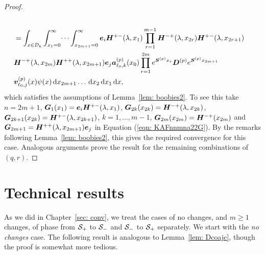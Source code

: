 \begin{proof}
\begin{align*}
		\\&=\int_{x\in\mathcal{D}_k}\int_{x_1=0}^\infty \dots \int_{x_{2m+1}=0}^\infty \boldsymbol e_i \boldsymbol H^{+-}(\lambda,x_1)\prod_{r=1}^{m-1}\boldsymbol H^{-+}(\lambda,x_{2r}) \boldsymbol H^{+-}(\lambda,x_{2r+1}) \\&\boldsymbol H^{-+}(\lambda,x_{2m}) 
		\boldsymbol H^{++}(\lambda,x_{2m+1})\boldsymbol e_j \nonumber
		\boldsymbol a_{\ell_0,k}^{(p)}(x_0)\prod_{r=1}^{2m} e^{\boldsymbol{S}^{(p)}x_{r}}\boldsymbol{D}^{(p)} e^{\boldsymbol{S}^{(p)}x_{2m+1}}
		\\& {\boldsymbol v}_{\ell_0,j}^{(p)}(x)\psi(x)\, \mathrm{d} x_{2m+1}\dots\, \mathrm{d} x_2 \, \mathrm{d} x_1 \, \mathrm{d} x,
	\end{align*}
	which satisfies the assumptions of Lemma~\ref{lem: boobies2}. To see this take \(n=2m+1\), \(\boldsymbol G_1(x_1) = \boldsymbol e_i\boldsymbol H^{+-}(\lambda, x_1)\), \(\boldsymbol G_{2k}(x_{2k}) = \boldsymbol H^{-+}(\lambda, x_{2k})\), \(\boldsymbol G_{2k+1}(x_{2k}) = \boldsymbol H^{+-}(\lambda, x_{2k+1})\), \(k=1,\dots,m-1\), \(\boldsymbol G_{2m}(x_{2m}) = \boldsymbol H^{-+}(x_{2m})\) and \(\boldsymbol G_{2m+1} = \boldsymbol H^{++}(\lambda,x_{2m+1})\boldsymbol e_j\) in Equation (\ref{eqn: KAFnnmna22G}). By the remarks following Lemma~\ref{lem: boobies2}, this gives the required convergence for this case. Analogous arguments prove the result for the remaining combinations of \((q,r)\). 
\end{proof}

\section{Technical results}
As we did in Chapter~\ref{sec: conv}, we treat the cases of no changes, and \(m\geq 1\) changes, of phase from \(\mathcal{S}_+\) to \(\mathcal{S}_-\) and \(\mathcal{S}_-\) to \(\mathcal{S}_+\) separately. We start with the \emph{no changes} case. The following result is analogous to Lemma~\ref{lem: Dcoajc}, though the proof is somewhat more tedious. 

